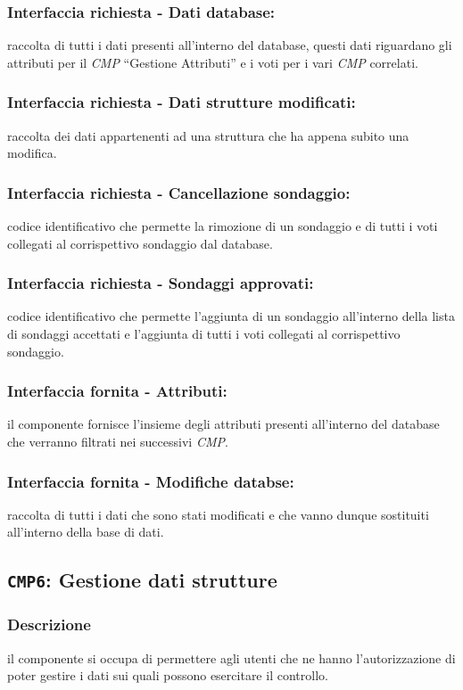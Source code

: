         \subsubsection{Interfaccia richiesta - Dati database:}
            raccolta di tutti i dati presenti all'interno del database, questi dati riguardano gli attributi per il \textit{CMP} ``Gestione Attributi'' e i voti per i vari \textit{CMP} correlati.
        \subsubsection{Interfaccia richiesta - Dati strutture modificati:}
            raccolta dei dati appartenenti ad una struttura che ha appena subito una modifica.
        \subsubsection{Interfaccia richiesta - Cancellazione sondaggio:}
            codice identificativo che permette la rimozione di un sondaggio e di tutti i voti collegati al corrispettivo sondaggio dal database.
        \subsubsection{Interfaccia richiesta - Sondaggi approvati:}
            codice identificativo che permette l'aggiunta di un sondaggio all'interno della lista di sondaggi accettati e l'aggiunta di tutti i voti collegati al corrispettivo sondaggio.
        \subsubsection{Interfaccia fornita - Attributi:}
            il componente fornisce l'insieme degli attributi presenti all'interno del database che verranno filtrati nei successivi \textit{CMP}.
        \subsubsection{Interfaccia fornita - Modifiche databse:}
            raccolta di tutti i dati che sono stati modificati e che vanno dunque sostituiti all'interno della base di dati.
    
    \subsection{\texttt{CMP6}: Gestione dati strutture}
        \subsubsection{Descrizione}
            il componente si occupa di permettere agli utenti che ne hanno l'autorizzazione di poter gestire i dati sui quali possono esercitare il controllo.
